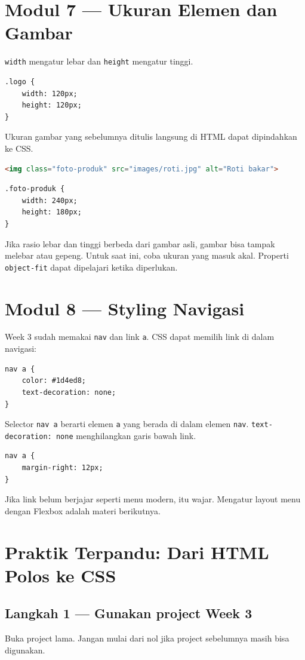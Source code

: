 \documentclass[11pt,a4paper]{article}
\begin{document}
\section{Modul 7 --- Ukuran Elemen dan Gambar}
\texttt{width} mengatur lebar dan \texttt{height} mengatur tinggi.
\begin{lstlisting}
.logo {
    width: 120px;
    height: 120px;
}
\end{lstlisting}
Ukuran gambar yang sebelumnya ditulis langsung di HTML dapat dipindahkan ke CSS.
\begin{lstlisting}[language=HTML]
<img class="foto-produk" src="images/roti.jpg" alt="Roti bakar">
\end{lstlisting}
\begin{lstlisting}
.foto-produk {
    width: 240px;
    height: 180px;
}
\end{lstlisting}
Jika rasio lebar dan tinggi berbeda dari gambar asli, gambar bisa tampak melebar atau gepeng. Untuk saat ini, coba ukuran yang masuk akal. Properti \texttt{object-fit} dapat dipelajari ketika diperlukan.

\section{Modul 8 --- Styling Navigasi}
Week 3 sudah memakai \texttt{nav} dan link \texttt{a}. CSS dapat memilih link di dalam navigasi:
\begin{lstlisting}
nav a {
    color: #1d4ed8;
    text-decoration: none;
}
\end{lstlisting}
Selector \texttt{nav a} berarti elemen \texttt{a} yang berada di dalam elemen \texttt{nav}. \texttt{text-decoration: none} menghilangkan garis bawah link.
\begin{lstlisting}
nav a {
    margin-right: 12px;
}
\end{lstlisting}
Jika link belum berjajar seperti menu modern, itu wajar. Mengatur layout menu dengan Flexbox adalah materi berikutnya.

\section{Praktik Terpandu: Dari HTML Polos ke CSS}
\subsection{Langkah 1 --- Gunakan project Week 3}
Buka project lama. Jangan mulai dari nol jika project sebelumnya masih bisa digunakan.
\end{document}
